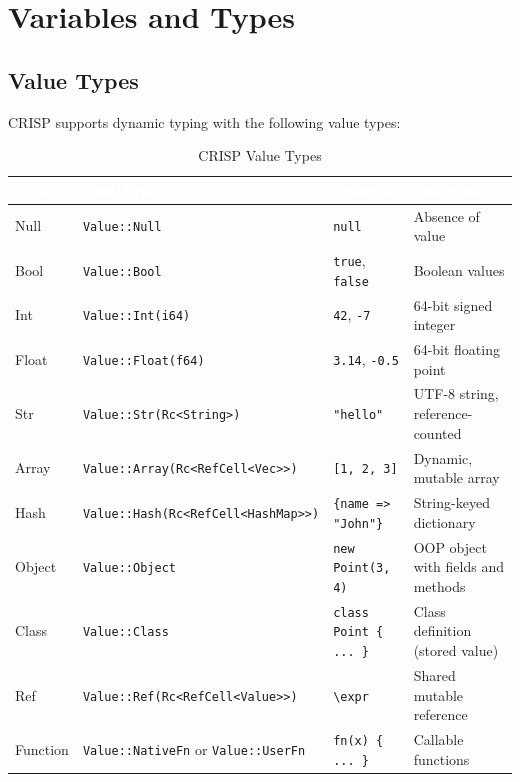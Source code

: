 \section{Variables and Types}

\subsection{Value Types}

CRISP supports dynamic typing with the following value types:

\begin{table}[H]
\centering
{}
\caption{\textcolor{darkpurple}{CRISP Value Types}}
\vspace{0.3em}
\begin{tabular}{@{}lllp{5.5cm}@{}}
\toprule
\rowcolor{softvioletdark}
\textbf{\textcolor{white}{Type}} & \textbf{\textcolor{white}{Rust Type}} & \textbf{\textcolor{white}{Example}} & \textbf{\textcolor{white}{Description}} \\
\midrule
Null & \texttt{Value::Null} & \texttt{null} & Absence of value \\
Bool & \texttt{Value::Bool} & \texttt{true}, \texttt{false} & Boolean values \\
Int & \texttt{Value::Int(i64)} & \texttt{42}, \texttt{-7} & 64-bit signed integer \\
Float & \texttt{Value::Float(f64)} & \texttt{3.14}, \texttt{-0.5} & 64-bit floating point \\
Str & \texttt{Value::Str(Rc<String>)} & \texttt{"hello"} & UTF-8 string, reference-counted \\
Array & \texttt{Value::Array(Rc<RefCell<Vec>>)} & \texttt{[1, 2, 3]} & Dynamic, mutable array \\
Hash & \texttt{Value::Hash(Rc<RefCell<HashMap>>)} & \texttt{\{name => "John"\}} & String-keyed dictionary \\
Object & \texttt{Value::Object} & \texttt{new Point(3, 4)} & OOP object with fields and methods \\
Class & \texttt{Value::Class} & \texttt{class Point \{ ... \}} & Class definition (stored value) \\
Ref & \texttt{Value::Ref(Rc<RefCell<Value>>)} & \texttt{\textbackslash expr} & Shared mutable reference \\
Function & \texttt{Value::NativeFn} or \texttt{Value::UserFn} & \texttt{fn(x) \{ ... \}} & Callable functions \\
\bottomrule
\end{tabular}
\end{table}

